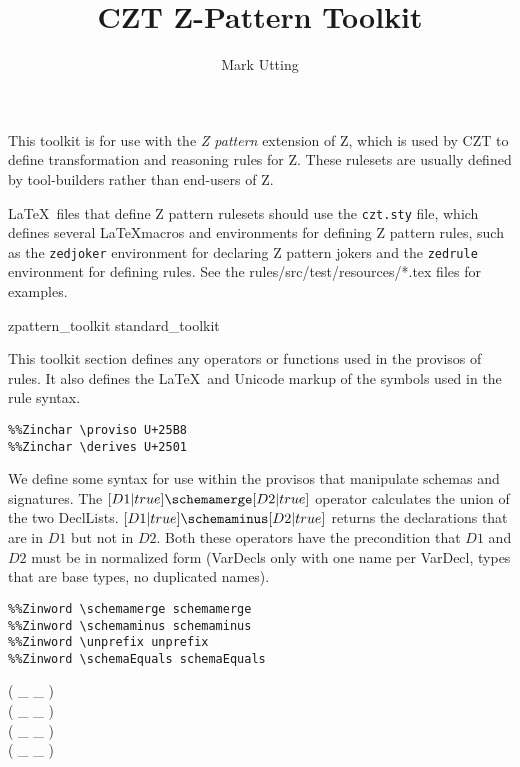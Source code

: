 \documentclass[10pt]{article}
\title{CZT Z-Pattern Toolkit}
\author{Mark Utting}
\begin{document}
\maketitle

This toolkit is for use with the \emph{Z pattern} extension of Z,
which is used by CZT to define transformation and reasoning rules
for Z.  These rulesets are usually defined by tool-builders rather
than end-users of Z.

\LaTeX\ files that define Z pattern rulesets should use the
\verb!czt.sty! file, which defines several \LaTeX macros and
environments for defining Z pattern rules, such as 
the \verb!zedjoker! environment for declaring
Z pattern jokers and the \verb!zedrule! environment for defining
rules.  See the rules/src/test/resources/*.tex files for examples.

\begin{zsection}
  \SECTION zpattern\_toolkit \parents standard\_toolkit
\end{zsection}

This toolkit section defines any operators or functions used in the
provisos of rules.  It also defines the \LaTeX\ and Unicode markup of
the symbols used in the rule syntax.

\begin{verbatim}
%%Zinchar \proviso U+25B8
%%Zinchar \derives U+2501
\end{verbatim}

We define some syntax for use within the provisos that manipulate
schemas and signatures.  The $[D1|true] \schemamerge [D2|true]$
operator calculates the union of the two DeclLists. 
$[D1|true] \schemaminus [D2|true]$ returns the declarations that are in
$D1$ but not in $D2$.  Both these operators have the precondition that
$D1$ and $D2$ must be in normalized form (VarDecls only with one name
per VarDecl, types that are base types, no duplicated names).

\begin{verbatim}
%%Zinword \schemamerge schemamerge
%%Zinword \schemaminus schemaminus
%%Zinword \unprefix unprefix
%%Zinword \schemaEquals schemaEquals
\end{verbatim}

\begin{zed}
   \leftassoc ( \_ \schemamerge \_ ) \\
   \leftassoc ( \_ \schemaminus \_ ) \\
   \leftassoc ( \_ \unprefix \_ ) \\
  \relation ( \_ \schemaEquals \_ )
\end{zed}
\end{document}
